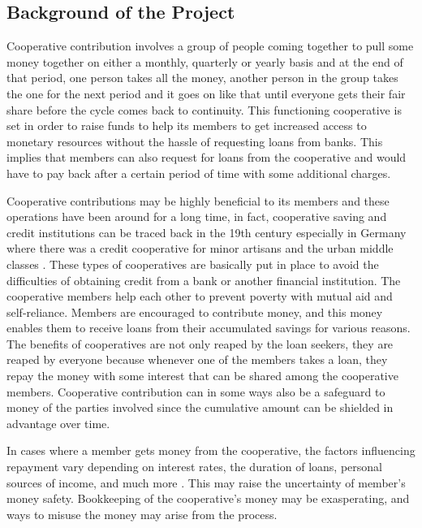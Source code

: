 \documentclass{article}
\begin{document}
\begin{flushleft}
\subsection{Background of the Project}
Cooperative contribution involves a group of people coming together to pull some money together on either a monthly, quarterly or yearly basis and at the end of that period, one person takes all the money, another person in the group takes the one for the next period and it goes on like that until everyone gets their fair share before the cycle comes back to continuity. This functioning cooperative is set in order to raise funds to help its members to get increased access to monetary resources without the hassle of requesting loans from banks. This implies that members can also request for loans from the cooperative and would have to pay back after a certain period of time with some additional charges.

Cooperative contributions may be highly beneficial to its members and these operations have been around for a long time, in fact, cooperative saving and credit institutions can be traced back in the 19th century especially in Germany where there was a credit cooperative for minor artisans and the urban middle classes \cite{galor2018saving}. These types of cooperatives are basically put in place to avoid the difficulties of obtaining credit from a bank or another financial institution. The cooperative members help each other to prevent poverty with mutual aid and self-reliance. Members are encouraged to contribute money, and this money enables them to receive loans from their accumulated savings for various reasons. The benefits of cooperatives are not only reaped by the loan seekers, they are reaped by everyone because whenever one of the members takes a loan, they repay the money with some interest that can be shared among the cooperative members. Cooperative contribution can in some ways also be a safeguard to money of the parties involved since the cumulative amount can be shielded in advantage over time. \cite{galor2018saving}

In cases where a member gets money from the cooperative, the factors influencing repayment vary depending on interest rates, the duration of loans, personal sources of income, and much more \cite{papias2009repayment}. This may raise the uncertainty of member’s money safety. Bookkeeping of the cooperative’s money may be exasperating, and ways to misuse the money may arise from the process.


\end{flushleft}
\end{document}
